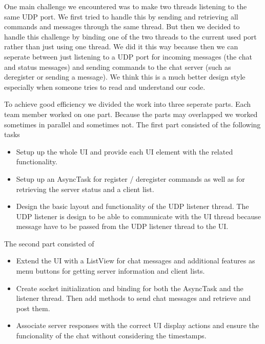 \documentclass{report}
\begin{document}
One main challenge we encountered was to make two threads listening to the same UDP port. We first tried to handle this by sending and retrieving all commands and messages through the same thread. But then we decided to handle this challenge by binding one of the two threads to the current used port rather than just using one thread. We did it this way because then we can seperate between just listening to a UDP port for incoming messages (the chat and status messages) and sending commands to the chat server (such as deregister or sending a message). We think this is a much better design style especially when someone tries to read and understand our code.

To achieve good efficiency we divided the work into three seperate parts. Each team member worked on one part. Because the parts may overlapped we worked sometimes in parallel and sometimes not. The first part consisted of the following tasks
\begin{itemize}
  \item Setup up the whole UI and provide each UI element with the related functionality. 
  \item Setup up an AsyncTask for register / deregister commands as well as for retrieving the server status and a client list.
  \item Design the basic layout and functionality of the UDP listener thread. The UDP listener is design to be able to communicate with the UI thread because message have to be passed from the UDP listener thread to the UI.
\end{itemize}

The second part consisted of
\begin{itemize}
  \item Extend the UI with a ListView for chat messages and additional features as menu buttons for getting server information and client lists.
  \item Create socket initialization and binding for both the AsyncTask and the listener thread. Then add methods to send chat messages and retrieve and post them.
  \item Associate server responses with the correct UI display actions and ensure the funcionality of the chat without considering the timestamps.
\end{itemize}
\end{document}
